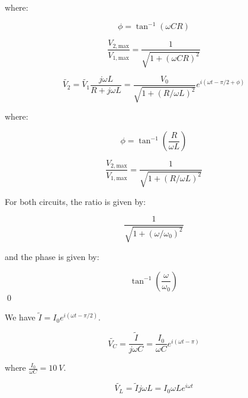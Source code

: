 \documentclass[12pt]{article}
\begin{document}
where:

\begin{equation}
    \phi = \tan^{-1}{\left( \omega C R \right)}
\end{equation}

\begin{equation}
    \frac{V_{2, \text{max}}}{V_{1, \text{max}}} = \frac{1}{\sqrt{1 + (\omega C R)^{2}}}
\end{equation}


\begin{equation}
    \tilde{V_{2}} = \tilde{V_{1}} \frac{j \omega L}{R + j \omega L} = \frac{V_{0}}{\sqrt{1 + (R/\omega L)^{2}}} e^{i(\omega t - \pi/2 + \phi)}
\end{equation}

where:

\begin{equation}
    \phi = \tan^{-1}{\left( \frac{R}{\omega L} \right)}
\end{equation}

\begin{equation}
    \frac{V_{2, \text{max}}}{V_{1, \text{max}}} = \frac{1}{\sqrt{1 + (R/\omega L)^{2}}}
\end{equation}

For both circuits, the ratio is given by:

\begin{equation}
    \frac{1}{\sqrt{1 + (\omega/\omega_{0})^{2}}}
\end{equation}

and the phase is given by:

\begin{equation}
    \tan^{-1}{\left( \frac{\omega}{\omega_{0}} \right)}
\end{equation}
\qed


We have $\tilde{I} = I_{0} e^{i(\omega t - \pi/2)}$.


\begin{equation}
    \tilde{V_{C}} = \frac{\tilde{I}}{j \omega C} = \frac{I_{0}}{\omega C} e^{i(\omega t - \pi)}
\end{equation}

where $\frac{I_{0}}{\omega C} = \qty{10}{V}$.

\begin{equation}
    \tilde{V_{L}} = \tilde{I} j \omega L = I_{0} \omega L e^{i\omega t}
\end{equation}
\end{document}
